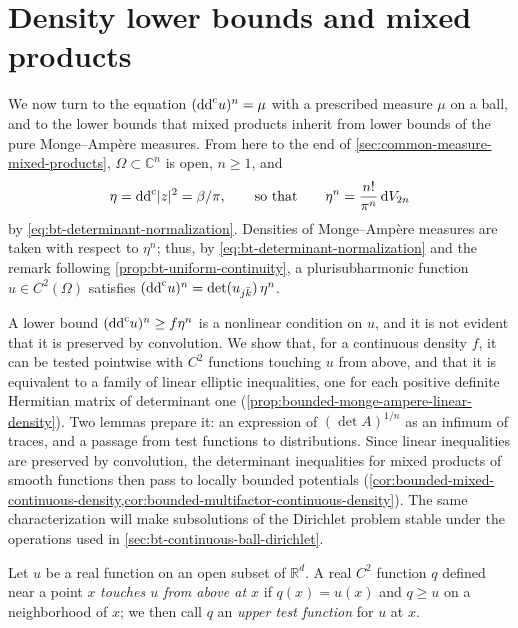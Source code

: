 \section{Density lower bounds and mixed products}
\label{sec:bt-density-lower-bounds}

We now turn to the equation $(\mathrm{dd}^{\mathrm{c}} u)^n=\mu$ with a prescribed measure $\mu$ on a ball, and to the lower bounds that mixed products inherit from lower bounds of the pure Monge--Amp\`ere measures. From here to the end of \cref{sec:common-measure-mixed-products}, $\Omega\subset\mathbb C^n$ is open, $n\ge1$, and
\[
 \eta=\mathrm{dd}^{\mathrm{c}}|z|^2=\beta/\pi,\qquad\text{so that}\qquad\eta^n=\frac{n!}{\pi^n}\,\mathrm dV_{2n}
\]
by \eqref{eq:bt-determinant-normalization}. Densities of Monge--Amp\`ere measures are taken with respect to $\eta^n$; thus, by \eqref{eq:bt-determinant-normalization} and the remark following \cref{prop:bt-uniform-continuity}, a plurisubharmonic function $u\in C^2(\Omega)$ satisfies $(\mathrm{dd}^{\mathrm{c}} u)^n=\det(u_{j\bar k})\,\eta^n$.

A lower bound $(\mathrm{dd}^{\mathrm{c}} u)^n\ge f\eta^n$ is a nonlinear condition on $u$, and it is not evident that it is preserved by convolution. We show that, for a continuous density $f$, it can be tested pointwise with $C^2$ functions touching $u$ from above, and that it is equivalent to a family of linear elliptic inequalities, one for each positive definite Hermitian matrix of determinant one (\cref{prop:bounded-monge-ampere-linear-density}). Two lemmas prepare it: an expression of $(\det A)^{1/n}$ as an infimum of traces, and a passage from test functions to distributions. Since linear inequalities are preserved by convolution, the determinant inequalities for mixed products of smooth functions then pass to locally bounded potentials (\cref{cor:bounded-mixed-continuous-density,cor:bounded-multifactor-continuous-density}). The same characterization will make subsolutions of the Dirichlet problem stable under the operations used in \cref{sec:bt-continuous-ball-dirichlet}.

Let $u$ be a real function on an open subset of $\mathbb R^d$. A real $C^2$ function $q$ defined near a point $x$ \emph{touches $u$ from above at $x$} if $q(x)=u(x)$ and $q\ge u$ on a neighborhood of $x$; we then call $q$ an \emph{upper test function} for $u$ at $x$.

